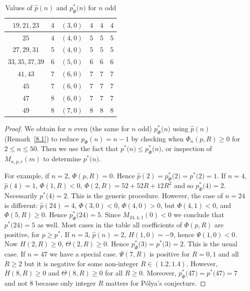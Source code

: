 \documentclass[11pt,a4paper,times]{amsart}
\theoremstyle{plain}
\theoremstyle{definition}
\numberwithin{equation}{section}
\newcommand{\pin}[1]{p^*{#1}}
\newcommand{\piphi}[1]{p^*_{\Phi}{#1}}
\begin{document}
{{\begin{table}[h!]
\begin{tabular}{|c|c|c|c|c|c|}
 \hline
  $19,21,23$ & $4$  & $(3,0)$   & $4$ & $4$ & $4$\\
 \hline
  $25$ & $4$  & $(4,0)$   & $5$ & $5$ & $5$\\
 \hline
   $27,29,31$ & $5$  & $(4,0)$   & $5$ & $5$ & $5$\\
 \hline
   $33,35,37,39$ & $6$  & $(5,0)$   & $6$ & $6$ & $6$\\
 \hline
   $41,43$ & $7$  & $(6,0)$   & $7$ & $7$ & $7$\\
 \hline
   $45$ & $7$  & $(6,0)$   & $7$ & $7$ & $7$\\
 \hline
    $47$ & $8$  & $(6,0)$   & $7$ & $7$ & $7$\\
    \hline
 $49$ & $8$  & $(7,0)$   & $8$ & $8$ & $8$\\
  \hline     
\end{tabular}
\vspace*{3mm}
 \caption{Values of $\hat{p}(n)$ and $\piphi(n)$ for $n$ odd}\label{oddp}
 \end{table}
}

\begin{proof}
We obtain for $n$ even (the same for $n$ odd) $\piphi(n)$ using $\hat{p}(n)$ (Remark~\ref{8.1}) to reduce $p_{\Phi}(n)=n-1$ by checking when $\Phi_n(p,R)\geq 0$ for $2\leq n\leq 50$. Then we use the fact that $\pin(n)\leq \piphi(n)$, or inspection of $M_{n,p,r}(m)$ to determine $\pin(n)$.

 For example, if $n=2$, $\Phi(p,R)= 0$. Hence $\hat{p}(2)=\piphi(2)=\pin(2)=1$. If $n=4$, $\hat{p}(4)=1$, $\Phi(1,R)<0$,
$\Phi(2,R)=52+52R+12 R^2$ and  so $\piphi(4)=2$. Necessarily $\pin(4)=2$. This is the generic procedure. However, the case of $n=24$ is different: $\hat{p}(24)=4$,  $\Phi(3,0)<0$, $\Phi(4,0)>0$, but $\Phi(4,1)<0$, and $\Phi(5,R)\geq 0$. Hence $\piphi(24)=5$. Since   $M_{24,4,1}(0)<0$ we  conclude that $\pin(24)=5$ as well.
Most cases in the table all coefficients of $\Phi(p,R)$ are positive, for $p\geq p^*$.
If $n=3$, $\hat{p}(n)=2$, $H(1,0)=-9$, hence $\Psi(1,0)<0$. Now $H(2,R)\geq 0$, $\Theta(2,R)\geq 0$. Hence $\piphi(3)=\pin(3)=2$. This is the usual case. If $n=47$ we have a special case. $\Psi(7,R)$ is positive for $R=0,1$ and all $R\geq 2$ but it is negative for some non-integer $R\in (1.2,1.4)$. However, $H(8,R)\geq 0$ and $\Theta(8,R)\geq 0$  for all $R\geq 0$. Moreover, $\piphi(47)=\pin(47)=7$ and not $8$ because only integer $R$  matters for P\'{o}lya's conjecture.
 \end{proof}
}
\end{document}
